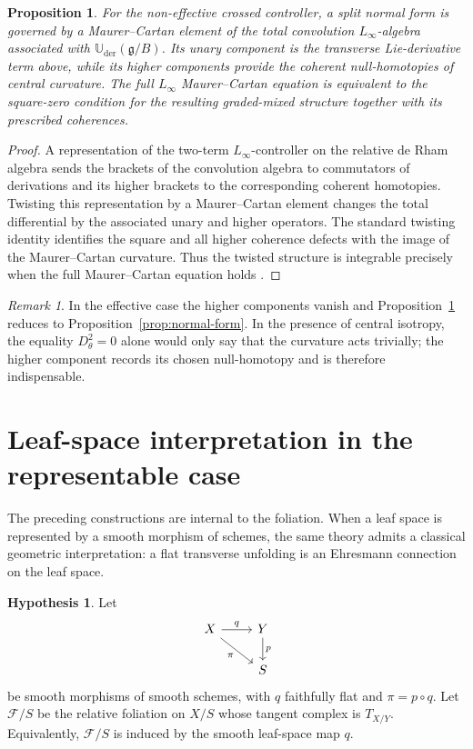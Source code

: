 \documentclass[11pt,reqno,a4paper,dvipsnames,x11names]{amsart}
\numberwithin{equation}{section}
\theoremstyle{plain}
\newtheorem{proposition}[theorem]{Proposition}
\theoremstyle{definition}
\newtheorem{hypothesis}[theorem]{Hypothesis}
\theoremstyle{remark}
\newtheorem{remark}[theorem]{Remark}
\newcommand{\cF}{\mathcal F}
\newcommand{\g}{\mathfrak g}
\newcommand{\Uder}{\mathbb U_{\mathrm{der}}}
\begin{document}
\begin{proposition}\label{prop:higher-normal-form}
For the non-effective crossed controller, a split normal form is governed by a Maurer--Cartan element of the total convolution \(L_\infty\)-algebra associated with
\(\Uder(\g/B)\). Its unary component is the transverse Lie-derivative term above, while its higher components provide the coherent null-homotopies of central curvature. The full \(L_\infty\) Maurer--Cartan equation is equivalent to the square-zero condition for the resulting graded-mixed structure together with its prescribed coherences.
\end{proposition}

\begin{proof}
A representation of the two-term \(L_\infty\)-controller on the relative de Rham algebra sends the brackets of the convolution algebra to commutators of derivations and its higher brackets to the corresponding coherent homotopies. Twisting this representation by a Maurer--Cartan element changes the total differential by the associated unary and higher operators. The standard twisting identity identifies the square and all higher coherence defects with the image of the Maurer--Cartan curvature. Thus the twisted structure is integrable precisely when the full Maurer--Cartan equation holds \cite{Hinich01,Pridham10,Nuiten}.
\end{proof}

\begin{remark}
In the effective case the higher components vanish and Proposition~\ref{prop:higher-normal-form} reduces to Proposition~\ref{prop:normal-form}. In the presence of central isotropy, the equality \(D_\theta^2=0\) alone would only say that the curvature acts trivially; the higher component records its chosen null-homotopy and is therefore indispensable.
\end{remark}


\section{Leaf-space interpretation in the representable case}\label{sec:leaf-space}

The preceding constructions are internal to the foliation. When a leaf space is represented by a smooth morphism of schemes, the same theory admits a classical geometric interpretation: a flat transverse unfolding is an Ehresmann connection on the leaf space.

\begin{hypothesis}
Let
\[
\begin{tikzcd}
X \arrow[r,"q"] \arrow[dr,"\pi"'] & Y \arrow[d,"p"] \\
& S
\end{tikzcd}
\]
be smooth morphisms of smooth schemes, with \(q\) faithfully flat and \(\pi=p\circ q\). Let \(\cF/S\) be the relative foliation on \(X/S\) whose tangent complex is \(T_{X/Y}\). Equivalently, \(\cF/S\) is induced by the smooth leaf-space map \(q\).
\end{hypothesis}
\end{document}
